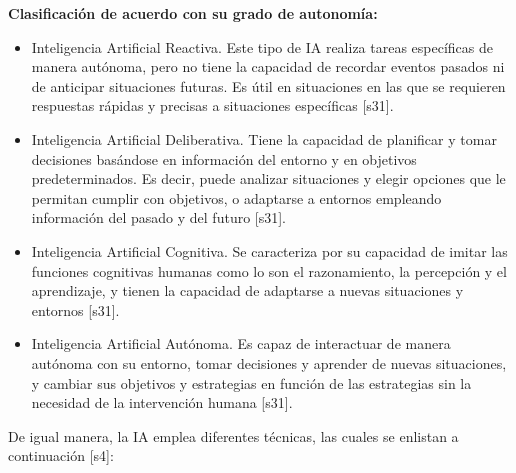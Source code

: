\textbf{Clasificación de acuerdo con su grado de autonomía:}

\begin{itemize}
    \item Inteligencia Artificial Reactiva. Este tipo de IA realiza tareas específicas de manera autónoma, pero no tiene la capacidad de recordar eventos pasados ni de anticipar situaciones futuras. Es útil en situaciones en las que se requieren respuestas rápidas y precisas a situaciones específicas [s31].\\
\item Inteligencia Artificial Deliberativa. Tiene la capacidad de planificar y tomar decisiones basándose en información del entorno y en objetivos predeterminados. Es decir, puede analizar situaciones y elegir opciones que le permitan cumplir con objetivos, o adaptarse a entornos empleando información del pasado y del futuro [s31].\\

\item Inteligencia Artificial Cognitiva. Se caracteriza por su capacidad de imitar las funciones cognitivas humanas como lo son el razonamiento, la percepción y el aprendizaje, y tienen la capacidad de adaptarse a nuevas situaciones y entornos [s31].\\

\item Inteligencia Artificial Autónoma. Es capaz de interactuar de manera autónoma con su entorno, tomar decisiones y aprender de nuevas situaciones, y cambiar sus objetivos y estrategias en función de las estrategias sin la necesidad de la intervención humana [s31].

\end{itemize}

De igual manera, la IA emplea diferentes técnicas, las cuales se enlistan a continuación [s4]:

